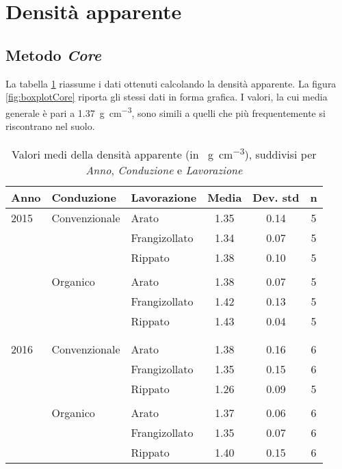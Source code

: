 \documentclass[a4paper]{article}
\begin{document}
%
\section{Densità apparente}


\subsection{Metodo \emph{Core}}

La tabella \ref{tab:summaryCore} riassume i dati ottenuti calcolando
la densità apparente. La figura \ref{fig:boxplotCore} riporta gli stessi dati in
forma grafica. I valori, la cui media generale \`e pari a
\SI{1.37}{\gram\per\cubic\centi\metre},
sono simili a quelli che pi\`u frequentemente si riscontrano nel
suolo.


\begin{table}[hb]
\centering
\caption{Valori medi della densità apparente (in \SI{}{\gram\per\cubic\centi\metre}),
suddivisi per \emph{Anno}, \emph{Conduzione} e \emph{Lavorazione} } 
\label{tab:summaryCore}
\begin{tabular}{lllccc}
  \hline
Anno & Conduzione & Lavorazione & Media & Dev. std & n \\ 
  \hline
2015 & Convenzionale & Arato & 1.35 & 0.14 &   5 \\ 
    &   & Frangizollato & 1.34 & 0.07 &   5 \\ 
    &   & Rippato & 1.38 & 0.10 &   5 \\ 
\\
    & Organico & Arato & 1.38 & 0.07 &   5 \\ 
    &   & Frangizollato & 1.42 & 0.13 &   5 \\ 
    &   & Rippato & 1.43 & 0.04 &   5 \\ 
\\
\\
  2016 & Convenzionale & Arato & 1.38 & 0.16 &   6 \\ 
    &   & Frangizollato & 1.35 & 0.15 &   6 \\ 
    &   & Rippato & 1.26 & 0.09 &   5 \\ 
\\
    & Organico & Arato & 1.37 & 0.06 &   6 \\ 
    &   & Frangizollato & 1.35 & 0.07 &   6 \\ 
    &   & Rippato & 1.40 & 0.15 &   6 \\ 
\hline
\end{tabular}
\end{table}\FloatBarrier
\end{document}
